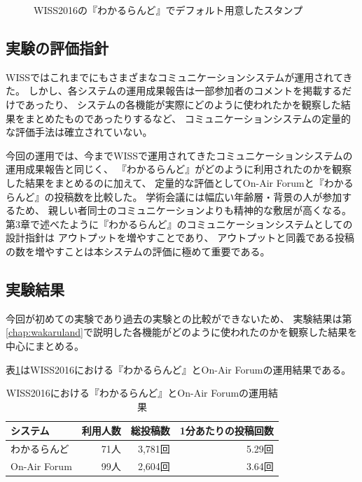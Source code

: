 \begin{figure}[h]
\centering
{}
\caption{WISS2016の『わかるらんど』でデフォルト用意したスタンプ}
\label{wiss2016stamp}
\end{figure}


\subsection{実験の評価指針}
WISSではこれまでにもさまざまなコミュニケーションシステムが運用されてきた。
しかし、各システムの運用成果報告は一部参加者のコメントを掲載するだけであったり、
システムの各機能が実際にどのように使われたかを観察した結果をまとめたものであったりするなど、
コミュニケーションシステムの定量的な評価手法は確立されていない\cite{nishida2006}\cite{nishida2011}。

今回の運用では、今までWISSで運用されてきたコミュニケーションシステムの運用成果報告と同じく、
『わかるらんど』がどのように利用されたのかを観察した結果をまとめるのに加えて、
定量的な評価としてOn-Air Forumと『わかるらんど』の投稿数を比較した。
学術会議には幅広い年齢層・背景の人が参加するため、
親しい者同士のコミュニケーションよりも精神的な敷居が高くなる。
第3章で述べたように『わかるらんど』のコミュニケーションシステムとしての設計指針は
アウトプットを増やすことであり、
アウトプットと同義である投稿の数を増やすことは本システムの評価に極めて重要である。

\subsection{実験結果}
今回が初めての実験であり過去の実験との比較ができないため、
実験結果は第\ref{chap:wakaruland}で説明した各機能がどのように使われたのかを観察した結果を中心にまとめる。

表\ref{tb:wiss2016experiment}はWISS2016における『わかるらんど』とOn-Air Forumの運用結果である。

\begin{table}[htb]
  \begin{center}
    \caption{WISS2016における『わかるらんど』とOn-Air Forumの運用結果}
    \label{tb:wiss2016experiment}
    \begin{tabular}{|l||r|r|r|} \hline
      システム & 利用人数 & 総投稿数 & 1分あたりの投稿回数 \\ \hline \hline
      わかるらんど & 71人 & 3,781回 & 5.29回 \\ \hline
      On-Air Forum & 99人 & 2,604回 & 3.64回 \\ \hline
    \end{tabular}
  \end{center}
\end{table}

